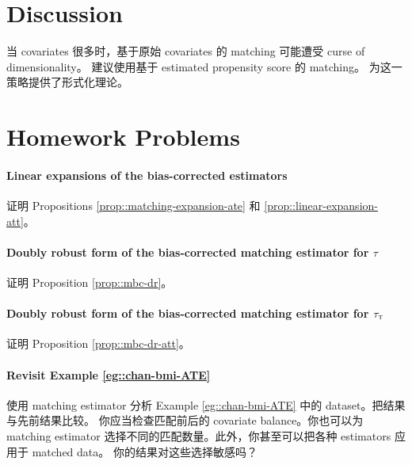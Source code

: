          

\section{Discussion}


当 covariates 很多时，基于原始 covariates 的 matching 可能遭受 curse of dimensionality。     \citet{rosenbaum1983central} 建议使用基于 estimated propensity score 的 matching。    \citet{abadie2016matching} 为这一策略提供了形式化理论。
         
         
         
\section{Homework Problems}

\paragraph{Linear expansions of the bias-corrected estimators}\label{para::linear-bcm-ate}


 证明 Propositions \ref{prop::matching-expansion-ate} 和 \ref{prop::linear-expansion-att}。
 
 
 
\paragraph{Doubly robust form of the bias-corrected matching estimator for $\tau$}\label{para::dr-mbc-form}

证明 Proposition \ref{prop::mbc-dr}。


\paragraph{Doubly robust form of the bias-corrected matching estimator for $\tau_\textsc{t}$}\label{para::dr-mbc-form-att}

证明 Proposition \ref{prop::mbc-dr-att}。
 

\paragraph{Revisit Example \ref{eg::chan-bmi-ATE}}


使用 matching estimator 分析 Example \ref{eg::chan-bmi-ATE} 中的 dataset。把结果与先前结果比较。
你应当检查匹配前后的 covariate balance。你也可以为 matching estimator 选择不同的匹配数量。此外，你甚至可以把各种 estimators 应用于 matched data。
你的结果对这些选择敏感吗？

